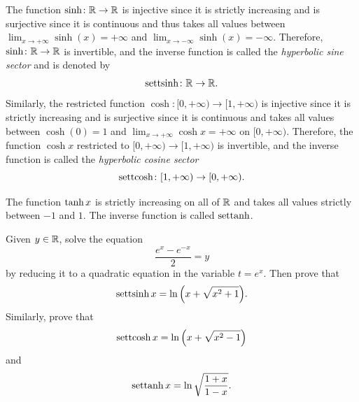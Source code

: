 The function $\sinh\colon {\mathbb R}\to{\mathbb R}$ is injective since it is strictly
increasing and is surjective since it is continuous and thus takes all values
between $\lim_{x\to+\infty} \sinh(x) = +\infty$ and $\lim_{x\to -\infty}
\sinh(x) = -\infty$. Therefore, $\sinh\colon {\mathbb R} \to {\mathbb R}$ is invertible, and the
inverse function is called the \emph{hyperbolic sine sector} and is denoted by
\mymargin{$\settsinh$}%
\index{$\settsinh$}
\[
    \operatorname{settsinh} \colon {\mathbb R} \to {\mathbb R}.
\]
Similarly, the restricted function $\cosh\colon [0,+\infty)\to [1,+\infty)$ is
injective since it is strictly increasing and is surjective since it is
continuous and takes all values between $\cosh(0)=1$ and $\lim_{x\to +\infty}
\cosh x = +\infty$ on $[0,+\infty)$. Therefore, the function $\cosh x$
restricted to $[0,+\infty)\to [1,+\infty)$ is invertible, and the inverse
function is called the \emph{hyperbolic cosine sector}
\mymargin{$\settcosh$}%
\index{$\settcosh$}
\[
    \operatorname{settcosh} \colon [1,+\infty)\to [0,+\infty).
\]

The function $\operatorname{tanh} x$ is strictly increasing on all of ${\mathbb R}$ and takes all
values strictly between $-1$ and $1$. The inverse function is called $\operatorname{settanh}$.

\begin{exercise}
Given $y\in {\mathbb R}$, solve the equation
\[
    \frac{e^x - e^{-x}}{2} = y
\]
by reducing it to a quadratic equation in the variable $t=e^x$. Then prove that
\[
    \operatorname{settsinh} x = \ln{\left( x + \sqrt{x^2 + 1} \right)}.
\]
Similarly, prove that
\[
    \operatorname{settcosh} x = \ln{\left( x + \sqrt{x^2 - 1} \right)}
\]
and
\[
    \operatorname{settanh} x = \ln \sqrt{\frac{1+x}{1-x}}.
\]
\end{exercise}